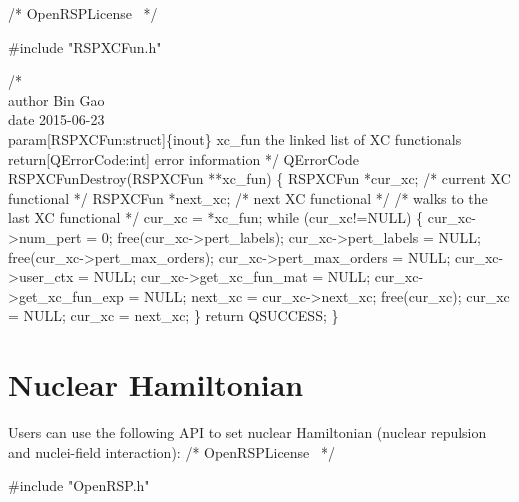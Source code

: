 \nwendcode{}\endmoddef
/*
  \LA{}OpenRSPLicense~{\nwtagstyle{}}\RA{}
*/

#include "RSPXCFun.h"

/*%
    \\author Bin Gao
    \\date 2015-06-23
    \\param[RSPXCFun:struct]\{inout\} xc_fun the linked list of XC functionals
    \\return[QErrorCode:int] error information
*/
QErrorCode RSPXCFunDestroy(RSPXCFun **xc_fun)
\{
    RSPXCFun *cur_xc;   /* current XC functional */
    RSPXCFun *next_xc;  /* next XC functional */
    /* walks to the last XC functional */
    cur_xc = *xc_fun;
    while (cur_xc!=NULL) \{
        cur_xc->num_pert = 0;
        free(cur_xc->pert_labels);
        cur_xc->pert_labels = NULL;
        free(cur_xc->pert_max_orders);
        cur_xc->pert_max_orders = NULL;
        cur_xc->user_ctx = NULL;
        cur_xc->get_xc_fun_mat = NULL;
        cur_xc->get_xc_fun_exp = NULL;
        next_xc = cur_xc->next_xc;
        free(cur_xc);
        cur_xc = NULL;
        cur_xc = next_xc;
    \}
    return QSUCCESS;
\}

\nwendcode{}\section{Nuclear Hamiltonian}
\label{section-OpenRSP-NucHamilton}

Users can use the following API to set nuclear Hamiltonian (nuclear repulsion
and nuclei-field interaction):
\nwenddocs{}\endmoddef
/*
  \LA{}OpenRSPLicense~{\nwtagstyle{}}\RA{}
*/

#include "OpenRSP.h"

